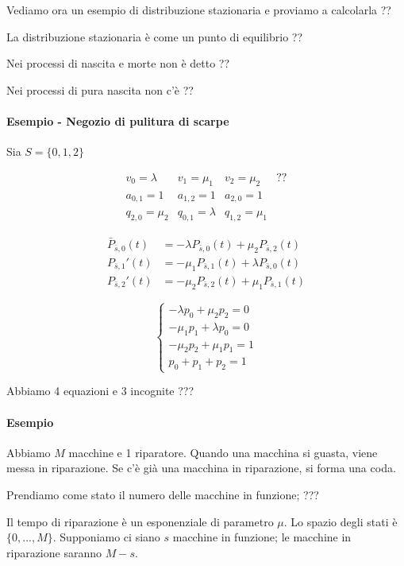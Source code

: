 \documentclass[a4paper,12pt]{book}
\begin{document}
Vediamo ora un esempio di distribuzione stazionaria e proviamo a calcolarla ?? %

La distribuzione stazionaria è come un punto di equilibrio ?? %

Nei processi di nascita e morte non è detto ?? %

Nei processi di pura nascita non c'è ?? %

\paragraph{Esempio - Negozio di pulitura di scarpe} Sia $ S = \{0,1,2\} $

$$ \begin{array}{cccc}
	v_0 = \lambda & v_1 = \mu_1 & v_2 = \mu_2 & ?? \\
	a_{0,1} = 1 & a_{1,2} = 1 & a_{2,0} = 1 \\
	q_{2,0} = \mu_2 & q_{0,1} = \lambda & q_{1,2} = \mu_1
\end{array} $$

\begin{align*}
	\bar{P}_{\bar{s},0}(t) & = -\lambda P_{\bar{s}, 0}(t) + \mu_2 P_{\bar{s},2}(t) \\
	{P}_{\bar{s},1}'(t) & = -\mu_1 P_{\bar{s}, 1}(t) + \lambda P_{\bar{s},0}(t) \\
	{P}_{\bar{s},2}'(t) & = -\mu_2 P_{\bar{s}, 2}(t) + \mu_1 P_{\bar{s},1}(t)
\end{align*}

$$ 
	\begin{cases}
		-\lambda p_0 + \mu_2 p_2 = 0 \\
		-\mu_1 p_1 + \lambda p_0 = 0 \\
		-\mu_2 p_2 + \mu_1 p_1 = 1 \\
		p_0 + p_1 + p_2 = 1
	\end{cases}
$$

Abbiamo 4 equazioni e 3 incognite ??? %

\paragraph{Esempio}

Abbiamo $ M $ macchine e 1 riparatore. Quando una macchina si guasta, viene messa in riparazione. Se c'è già una macchina in riparazione, si forma una coda. 

Prendiamo come stato il numero delle macchine in funzione; ??? %

Il tempo di riparazione è un esponenziale di parametro $\mu$. Lo spazio degli stati è $ \{0, ..., M\} $. Supponiamo ci siano $ s $ macchine in funzione; le macchine in riparazione saranno $ M - s $. 
\end{document}
